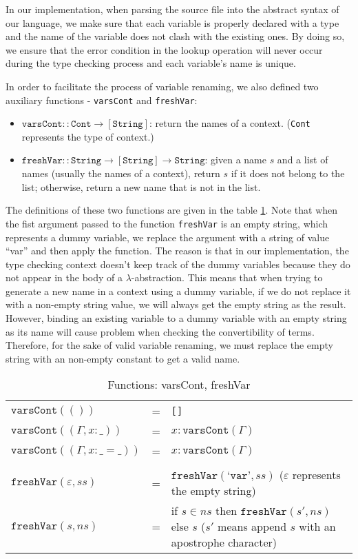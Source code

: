 \documentclass{article}
\theoremstyle{remark}
\begin{document}
In our implementation, when parsing the source file into the abstract syntax of our language, we make sure that each variable is properly declared with a type and the name of the variable does not clash with the existing ones. By doing so, we ensure that the error condition in the lookup operation will never occur during the type checking process and each variable's name is unique.

In order to facilitate the process of variable renaming, we also defined two auxiliary functions - \texttt{varsCont} and \texttt{freshVar}:
\begin{itemize}
  \item $\texttt{varsCont} :: \texttt{Cont} \to [\texttt{String}]$: return the names of a context. (\texttt{Cont} represents the type of context.)
  \item $\texttt{freshVar} :: \texttt{String} \to [\texttt{String}] \to \texttt{String}$: given a name $s$ and a list of names (usually the names of a context), return $s$ if it does not belong to the list; otherwise, return a new name that is not in the list.
\end{itemize}

The definitions of these two functions are given in the table \ref{tab:var-rename}. Note that when the fist argument passed to the function \texttt{freshVar} is an empty string, which represents a dummy variable, we replace the argument with a string of value ``var'' and then apply the function. The reason is that in our implementation, the type checking context doesn't keep track of the dummy variables because they do not appear in the body of a $\lambda$-abstraction. This means that when trying to generate a new name in a context using a dummy variable, if we do not replace it with a non-empty string value, we will always get the empty string as the result. However, binding an existing variable to a dummy variable with an empty string as its name will cause problem when checking the convertibility of terms. Therefore, for the sake of valid variable renaming, we must replace the empty string with an non-empty constant to get a valid name.  

\begin{table}[h] 
  \centering
  \begin{tabular}{l l p{6cm}}
    $\texttt{varsCont}(())$ & = & \texttt{[]} \\
    $\texttt{varsCont}((\Gamma, x : \_))$ & = & $x : \texttt{varsCont}(\Gamma)$ \\
    $\texttt{varsCont}((\Gamma, x : \_ = \_))$ & = & $x : \texttt{varsCont}(\Gamma)$ \\
    \\ 
    $\texttt{freshVar}(\varepsilon, ss)$ & = & $\texttt{freshVar}(\texttt{`var'}, ss)$ ($\varepsilon$ represents the empty string)\\
    $\texttt{freshVar}(s, ns)$ & = & if $s \in ns$ then $\texttt{freshVar}(s', ns)$ else $s$ ($s'$ means append $s$ with an apostrophe character)
  \end{tabular}
  \caption{Functions: varsCont, freshVar}
  \label{tab:var-rename}
\end{table}
\end{document}
